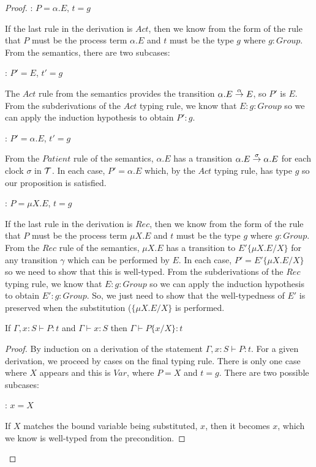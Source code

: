 \begin{proof}
: $P = \alpha.E$, $t = g$

\noindent If the last rule in the derivation is $Act$, then we know
from the form of the rule that $P$ must be the process term
$\alpha.E$ and $t$ must be the type $g$ where $g : Group$.  From
the semantics, there are two subcases:

: $P' = E$, $t' = g$

\noindent The $Act$ rule from the semantics provides the transition
$\alpha.E \stackrel{\alpha}{\rightarrow} E$, so $P'$ is $E$.  From the
subderivations of the $Act$ typing rule, we know that $E : g : Group$
so we can apply the induction hypothesis to obtain $P' : g$.

: $P' = \alpha.E$, $t' = g$

\noindent From the $Patient$ rule of the semantics, $\alpha.E$ has a transition
$\alpha.E \stackrel{\sigma}{\rightarrow} \alpha.E$ for each clock $\sigma$ in
$\text{$\mathcal{T}$}$.  In each case, $P' = \alpha.E$ which, by the $Act$ typing
rule, has type $g$ so our proposition is satisfied.

: $P = \mu X.E$, $t = g$

\noindent If the last rule in the derivation is $Rec$, then we know
from the form of the rule that $P$ must be the process term $\mu X.E$
and $t$ must be the type $g$ where $g : Group$.  From the $Rec$ rule
of the semantics, $\mu X.E$ has a transition to $E'\{\mu X.E/X\}$ for
any transition $\gamma$ which can be performed by $E$.  In each case,
$P' = E'\{\mu X.E/X\}$ so we need to show that this is well-typed.
From the subderivations of the $Rec$ typing rule, we know that $E : g
: Group$ so we can apply the induction hypothesis to obtain $E' : g :
Group$.  So, we just need to show that the well-typedness of $E'$ is
preserved when the substitution ($\{\mu X.E/X\}$ is performed.

\begin{lemma}
If $\Gamma, x : S \vdash P : t$ and $\Gamma \vdash x : S$ then $\Gamma \vdash P\{x/X\} : t$
\end{lemma}

\begin{proof}
By induction on a derivation of the statement $\Gamma, x : S \vdash P
: t$.  For a given derivation, we proceed by cases on the final typing
rule.  There is only one case where $X$ appears and this is $Var$,
where $P = X$ and $t = g$.  There are two possible subcases:

: $x = X$

\noindent If $X$ matches the bound variable being substituted, $x$, then it
becomes $x$, which we know is well-typed from the precondition.
  

\end{proof}
\end{proof}

